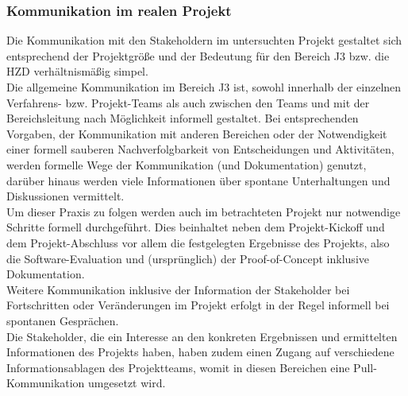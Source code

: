 \documentclass[ThesisDJ.tex]{subfiles}
\begin{document}
\subsubsection{Kommunikation im realen Projekt}
Die Kommunikation mit den Stakeholdern im untersuchten Projekt gestaltet sich entsprechend der Projektgröße und der Bedeutung für den Bereich J3 bzw. die HZD verhältnismäßig simpel.\\
Die allgemeine Kommunikation im Bereich J3 ist, sowohl innerhalb der einzelnen Verfahrens- bzw. Projekt-Teams als auch zwischen den Teams und mit der Bereichsleitung nach Möglichkeit informell gestaltet. Bei entsprechenden Vorgaben, der Kommunikation mit anderen Bereichen oder der Notwendigkeit einer formell sauberen Nachverfolgbarkeit von Entscheidungen und Aktivitäten, werden formelle Wege der Kommunikation (und Dokumentation) genutzt, darüber hinaus werden viele Informationen über spontane Unterhaltungen und Diskussionen vermittelt.\\
Um dieser Praxis zu folgen werden auch im betrachteten Projekt nur notwendige Schritte formell durchgeführt. Dies beinhaltet neben dem Projekt-Kickoff und dem Projekt-Abschluss vor allem die festgelegten Ergebnisse des Projekts, also die Software-Evaluation und (ursprünglich) der Proof-of-Concept inklusive Dokumentation.\\
Weitere Kommunikation inklusive der Information der Stakeholder bei Fortschritten oder Veränderungen im Projekt erfolgt in der Regel informell bei spontanen Gesprächen.\\
Die Stakeholder, die ein Interesse an den konkreten Ergebnissen und ermittelten Informationen des Projekts haben, haben zudem einen Zugang auf verschiedene Informationsablagen des Projektteams, womit in diesen Bereichen eine Pull-Kommunikation umgesetzt wird.
\end{document}
